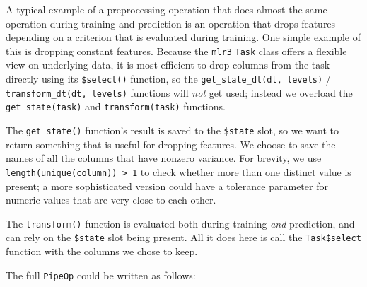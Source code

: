 \documentclass[]{article}
\begin{document}
A typical example of a preprocessing operation that does almost the same operation during training and prediction is an operation that drops features depending on a criterion that is evaluated during training.
One simple example of this is dropping constant features.
Because the \texttt{mlr3} \texttt{Task} class offers a flexible view on underlying data, it is most efficient to drop columns from the task directly using its \texttt{\$select()} function, so the \texttt{get\_state\_dt(dt,\ levels)} / \texttt{transform\_dt(dt,\ levels)} functions will \emph{not} get used; instead we overload the \texttt{get\_state(task)} and \texttt{transform(task)} functions.

The \texttt{get\_state()} function's result is saved to the \texttt{\$state} slot, so we want to return something that is useful for dropping features.
We choose to save the names of all the columns that have nonzero variance.
For brevity, we use \texttt{length(unique(column))\ \textgreater{}\ 1} to check whether more than one distinct value is present; a more sophisticated version could have a tolerance parameter for numeric values that are very close to each other.

The \texttt{transform()} function is evaluated both during training \emph{and} prediction, and can rely on the \texttt{\$state} slot being present.
All it does here is call the \texttt{Task\$select} function with the columns we chose to keep.

The full \texttt{PipeOp} could be written as follows:
\end{document}

